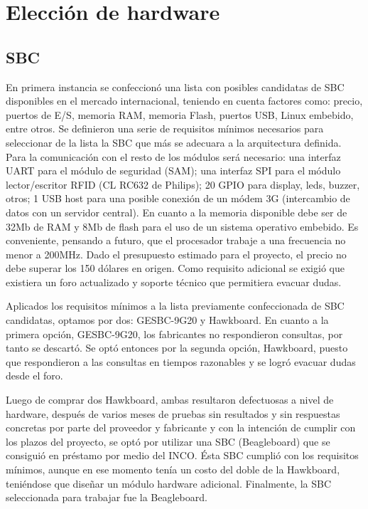 \bigskip


\section{Elecci\'on de hardware}

\subsection{SBC}
En primera instancia se confeccionó una lista con posibles candidatas de SBC disponibles
en el mercado internacional, teniendo en cuenta factores como: precio, puertos de E/S, memoria RAM, memoria Flash, puertos USB, Linux embebido, entre otros.
Se definieron una serie de requisitos mínimos necesarios para seleccionar de la lista la SBC que más se adecuara a la arquitectura definida.
Para la comunicación con el resto de los módulos será necesario: una interfaz UART para el módulo de seguridad (SAM); una interfaz SPI para el módulo lector/escritor RFID (CL RC632 de Philips); 20 GPIO para display, leds, buzzer, otros; 1 USB host para una posible conexión de un módem 3G (intercambio de datos con un servidor central). En cuanto a la memoria disponible debe ser de 32Mb de RAM y 8Mb de flash para el uso de un sistema operativo embebido. Es conveniente, pensando a futuro, que el procesador trabaje a una frecuencia no menor a 200MHz.
Dado el presupuesto estimado para el proyecto, el precio no debe superar los 150 dólares en origen.
Como requisito adicional se exigió que existiera un foro actualizado y soporte técnico que permitiera evacuar dudas.



Aplicados los requisitos mínimos a la lista previamente confeccionada de SBC candidatas, optamos por dos: GESBC-9G20 y Hawkboard.
En cuanto a la primera opción, GESBC-9G20, los fabricantes no respondieron consultas, por tanto se descartó. Se optó entonces por la segunda opción, Hawkboard, puesto que respondieron a las consultas en tiempos razonables y se logró evacuar dudas desde el foro.


Luego de comprar dos Hawkboard, ambas resultaron defectuosas a nivel de hardware, después de varios meses de pruebas sin resultados y sin respuestas concretas por parte del proveedor y fabricante y con la intención de cumplir con los plazos del proyecto, se optó por utilizar una SBC (Beagleboard) que se consiguió en préstamo por medio del INCO. Ésta SBC cumplió con los requisitos mínimos, aunque en ese momento tenía un costo del doble de la Hawkboard, teniéndose que diseñar un módulo hardware adicional.
Finalmente, la SBC seleccionada para trabajar fue la Beagleboard.

